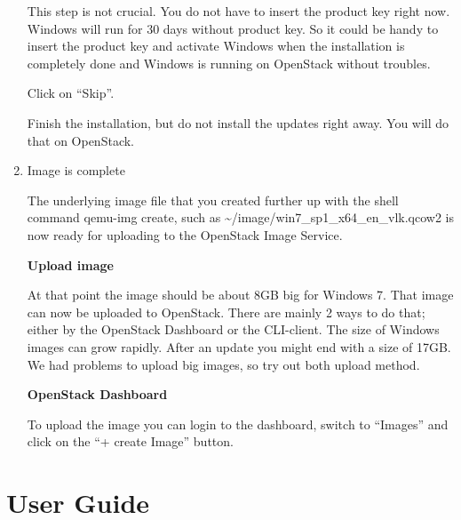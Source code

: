 \documentclass[letterpaper,10pt,english]{sphinxmanual}
\begin{document}
\begin{enumerate}
This step is not crucial. You do not have to insert the product key right now. Windows will run for 30 days without product key. So it could be handy to insert the product key and activate Windows when the installation is completely done and Windows is running on OpenStack without troubles.

Click on “Skip”.

Finish the installation, but do not install the updates right away. You will do that on OpenStack.

\item {} 
Image is complete

The underlying image file that you created further up with the shell command qemu-img create, such as \textasciitilde{}/image/win7\_sp1\_x64\_en\_vlk.qcow2 is now ready for uploading to the OpenStack Image Service.

\textbf{Upload image}

At that point the image should be about 8GB big for Windows 7. That image can now be uploaded to OpenStack. There are mainly 2 ways to do that; either by the OpenStack Dashboard or the CLI-client. The size of Windows images can grow rapidly. After an update you might end with a size of 17GB. We had problems to upload big images, so try out both upload method.

\textbf{OpenStack Dashboard}

To upload the image you can login to the dashboard, switch to “Images” and click on the “+ create Image” button.

\end{enumerate}


\chapter{User Guide}
\label{_source/user_guide:user-guide}\label{_source/user_guide::doc}
\end{document}
